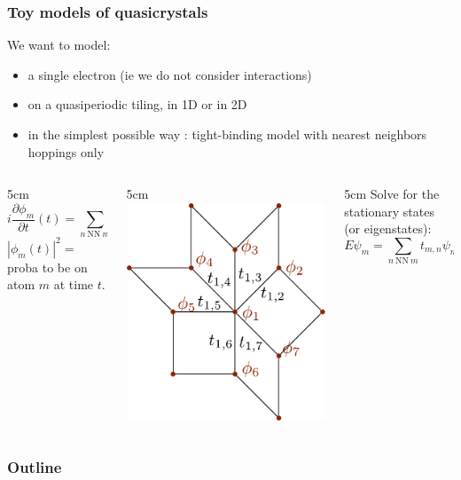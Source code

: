 \documentclass[xcolor=x11names,compress,professionalfonts, aspectratio=169]{beamer}
\renewcommand{\(}{\begin{columns}}
\renewcommand{\)}{\end{columns}}
\newcommand{\<}[1]{\begin{column}{#1}}
\renewcommand{\>}{\end{column}}
\begin{document}
\begin{frame}
\frametitle{Toy models of quasicrystals}
We want to model:
\begin{itemize}
	\item a single electron (ie we do not consider interactions)
	\item on a quasiperiodic tiling, in 1D or in 2D
	\item in the simplest possible way : tight-binding model with nearest neighbors hoppings only
\end{itemize}

\begin{columns}
\<{5cm}
\[
	i \frac{\partial \phi_m}{\partial t}(t) = \sum_{n ~\text{NN}~m} t_{m,n} \phi_n(t)
\]
$|\phi_m(t)|^2= $ proba to be on atom $m$ at time $t$.
\>

\<{5cm}
\centering
\includegraphics[scale=0.45]{img/ham_example.pdf}
\>

\<{5cm}
Solve for the stationary states (or eigenstates):
\[
	E \psi_m = \sum_{n ~\text{NN}~m} t_{m,n} \psi_n
\]
\>
\end{columns}
\end{frame}

\begin{frame}
\frametitle{Outline}
\tableofcontents[hideallsubsections]
\end{frame}
\end{document}
